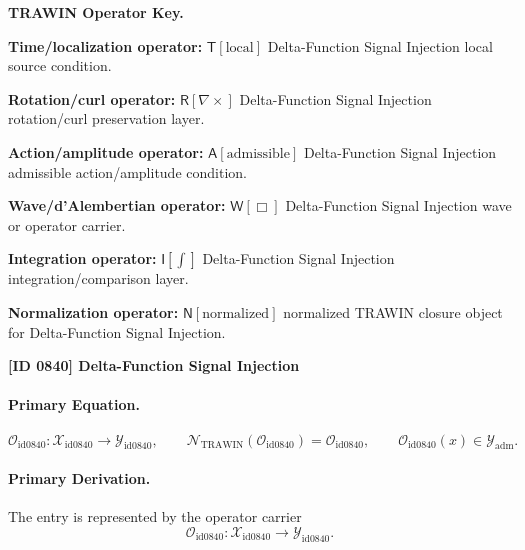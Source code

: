 \par\vspace{0.45\baselineskip}
\noindent\begin{minipage}[t]{\linewidth}
\begingroup
\small
\raggedright
\textbf{TRAWIN Operator Key.}\par
\noindent\textbf{Time/localization operator:} $\mathsf{T}\!\left[\mathrm{local}\right]$ Delta-Function Signal Injection local source condition.\par
\noindent\textbf{Rotation/curl operator:} $\mathsf{R}\!\left[\nabla\times\right]$ Delta-Function Signal Injection rotation/curl preservation layer.\par
\noindent\textbf{Action/amplitude operator:} $\mathsf{A}\!\left[\mathrm{admissible}\right]$ Delta-Function Signal Injection admissible action/amplitude condition.\par
\noindent\textbf{Wave/d'Alembertian operator:} $\mathsf{W}\!\left[\Box\right]$ Delta-Function Signal Injection wave or operator carrier.\par
\noindent\textbf{Integration operator:} $\mathsf{I}\!\left[\int\right]$ Delta-Function Signal Injection integration/comparison layer.\par
\noindent\textbf{Normalization operator:} $\mathsf{N}\!\left[\mathrm{normalized}\right]$ normalized TRAWIN closure object for Delta-Function Signal Injection.\par
\endgroup
\end{minipage}

\clearpage
\noindent\textbf{[ID 0840] Delta-Function Signal Injection}\par
\vspace{0.35em}
\paragraph{Primary Equation.}
\[
\mathcal{O}_{\mathrm{id0840}}:\mathcal{X}_{\mathrm{id0840}}\longrightarrow \mathcal{Y}_{\mathrm{id0840}},\qquad
\mathcal{N}_{\mathrm{TRAWIN}}(\mathcal{O}_{\mathrm{id0840}})=\mathcal{O}_{\mathrm{id0840}},\qquad
\mathcal{O}_{\mathrm{id0840}}(x)\in\mathcal{Y}_{\mathrm{adm}}.
\]

\paragraph{Primary Derivation.} The entry is represented by the operator carrier\[
\mathcal{O}_{\mathrm{id0840}}:\mathcal{X}_{\mathrm{id0840}}\longrightarrow \mathcal{Y}_{\mathrm{id0840}}.
\]

